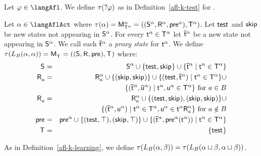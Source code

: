 \subsection{\classKFF{}}

\begin{definition}[Test]\label{afl-kff-test}
    Let $\phi \in \langAfl$.
    We define $\tau(\test{\phi})$ as in Definition~\ref{afl-k-test} for \classK{}.
\end{definition}

\begin{definition}[Learning]\label{afl-kff-learning}
    Let $\alpha \in \langAflAct$ where $\tau(\alpha) = \aPModel[\alpha]{\aStatesT[\alpha]} = \aPModelTuple[\alpha]{\aStatesT[\alpha]}$.
    Let $\aStateTest$ and $\aStateSkip$ be new states not appearing in $\aStates[\alpha]$.
    For every $\aStateT[\alpha] \in \aStatesT[\alpha]$ let $\aPStateT[\alpha]$ be a new state not appearing in $\aStates[\alpha]$.
    We call each $\aPStateT[\alpha]$ a {\em proxy state} for $\aStateT[\alpha]$.
    We define $\tau(\learns_\agentsB (\alpha, \alpha)) = \aPModel{\aStatesT} = \aPModelTuple{\aStatesT}$ where:
    \begin{eqnarray*}
        \aStates &=& \aStates[\alpha] \cup \{\aStateTest, \aStateSkip\} \cup \{\aPStateT[\alpha] \mid \aStateT[\alpha] \in \aStatesT[\alpha]\}\\
        \aAccessibility{\agentA} &=& \aAccessibility[\alpha]{\agentA} \cup \{(\aStateSkip, \aStateSkip)\} \cup \{(\aStateTest, \aPStateT[\alpha]) \mid \aStateT[\alpha] \in \aStatesT[\alpha]\} \cup \\&& \quad \{(\aPStateT[\alpha], \aPStateU[\alpha]) \mid \aStateT[\alpha], \aStateU[\alpha] \in \aStatesT[\alpha]\} \text{ for } \agentA \in \agentsB\\
        \aAccessibility{\agentA} &=& \aAccessibility[\alpha]{\agentA} \cup \{(\aStateTest, \aStateSkip), (\aStateSkip, \aStateSkip)\} \cup\\&& \quad \{(\aPStateT[\alpha], \aStateU[\alpha]) \mid \aStateT[\alpha] \in \aStatesT[\alpha], \aStateU[\alpha] \in \aStateT[\alpha] \aAccessibility[\alpha]{\agentA} \} \text{ for } \agentA \notin \agentsB\\
        \aPrecondition &=& \aPrecondition[\alpha] \cup \{(\aStateTest, \top), (\aStateSkip, \top)\} \cup \{(\aPStateT[\alpha], \aPrecondition[\alpha](\aStateT[\alpha])) \mid \aStateT[\alpha] \in \aStatesT[\alpha]\}\\
        \aStatesT &=& \{\aStateTest\}
    \end{eqnarray*}

    As in Definition~\ref{afl-k-learning}, we define $\tau(\learns_\agentsB (\alpha, \beta)) = \tau(\learns_\agentsB (\alpha \choice \beta, \alpha \choice \beta))$.
\end{definition}

